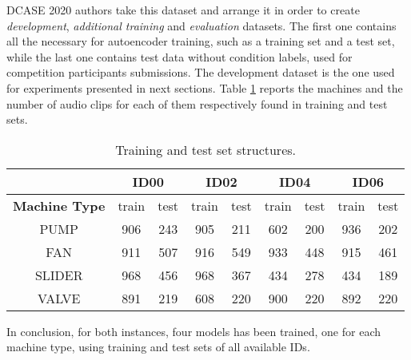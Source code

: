 DCASE 2020 authors take this dataset and arrange it in order to create \textit{development}, \textit{additional training} and \textit{evaluation} datasets. The first one contains all the necessary for autoencoder training, such as a training set and a test set, while the last one contains test data without condition labels, used for competition participants submissions. The development dataset is the one used for experiments presented in next sections. Table \ref{training-test-sets-structure} reports the machines and the number of audio clips for each of them respectively found in training and test sets.\\

\begin{table}[ht]
\centering
\begin{tabular}{|c|c|c|c|c|c|c|c|c|} 
\cline{2-9}
\multicolumn{1}{c|}{} & \multicolumn{2}{c|}{\textbf{ID00}} & \multicolumn{2}{c|}{\textbf{ID02}} & \multicolumn{2}{c|}{\textbf{ID04}} & \multicolumn{2}{c|}{\textbf{ID06}} \\ 
\hline
\textbf{Machine Type} & train & test & train & test & train & test & train & test \\ 
\hline
PUMP & 906 & 243 & 905 & 211 & 602 & 200 & 936 & 202 \\ 
\hline
FAN & 911 & 507 & 916 & 549 & 933 & 448 & 915 & 461 \\ 
\hline
SLIDER & 968 & 456 & 968 & 367 & 434 & 278 & 434 & 189 \\ 
\hline
VALVE & 891 & 219 & 608 & 220 & 900 & 220 & 892 & 220 \\
\hline
\end{tabular}
\caption{Training and test set structures.}
\label{training-test-sets-structure}
\end{table}
In conclusion, for both instances, four models has been trained, one for each machine type, using training and test sets of all available IDs.
